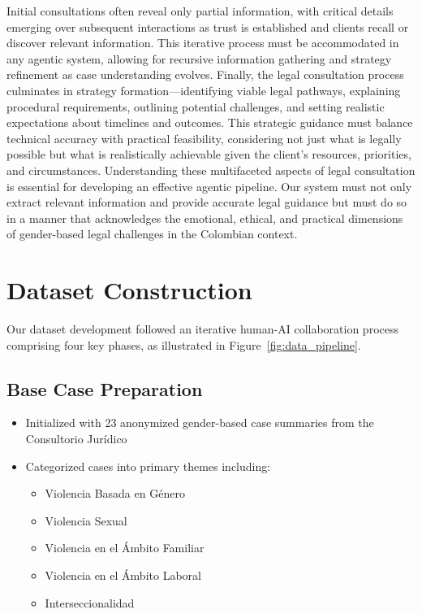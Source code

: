 Initial consultations often reveal only partial information, with critical details emerging over 
subsequent interactions as trust is established and clients recall or discover relevant information. 
This iterative process must be accommodated in any agentic system, allowing for recursive 
information gathering and strategy refinement as case understanding evolves.
Finally, the legal consultation process culminates in strategy formation—identifying viable 
legal pathways, explaining procedural requirements, outlining potential challenges, and setting 
realistic expectations about timelines and outcomes. This strategic guidance must balance 
technical accuracy with practical feasibility, considering not just what is legally possible 
but what is realistically achievable given the client's resources, priorities, and circumstances.
Understanding these multifaceted aspects of legal consultation is essential for developing an 
effective agentic pipeline. Our system must not only extract relevant information and provide 
accurate legal guidance but must do so in a manner that acknowledges the emotional, ethical, 
and practical dimensions of gender-based legal challenges in the Colombian context.

\section{Dataset Construction}
\label{sec:dataset}

Our dataset development followed an iterative human-AI collaboration process comprising four key phases, as illustrated in Figure~\ref{fig:data_pipeline}.

\subsection{Base Case Preparation}
\begin{itemize}
    \item Initialized with 23 anonymized gender-based case summaries from the Consultorio Jurídico
    \item Categorized cases into primary themes including:
    \begin{itemize}
        \item Violencia Basada en Género
        \item Violencia Sexual
        \item Violencia en el Ámbito Familiar
        \item Violencia en el Ámbito Laboral
        \item Interseccionalidad
    \end{itemize}
\end{itemize}

